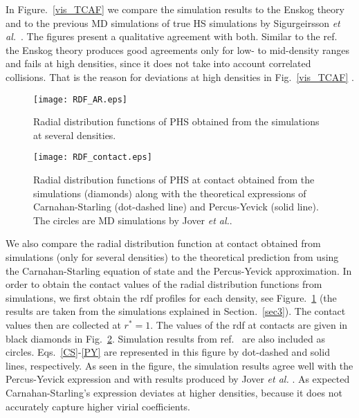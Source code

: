 \documentclass[preprint,pre,aps,superscriptaddress,a4paper]{revtex4}
\begin{document}
In Figure.~\ref{vis_TCAF} we compare the simulation results to the Enskog theory  and to the  previous MD simulations of  true HS simulations by Sigurgeirsson  {\it {et al.}}~\cite{heyes:09:0}.  The figures present a qualitative agreement with both. Similar to the ref.~\cite{heyes:09:0}  the Enskog theory produces good agreements only for low- to mid-density ranges and fails at high densities, since it does not take into account correlated collisions.
That is the reason for deviations at high densities in Fig.~\ref{vis_TCAF}  \cite{Santos:16:0,Viswanath:07:0,Sengers:00:0,Lucas:79:0}. 
\begin{figure}[H]
\centering
\vspace{1cm}
\texttt{[image: RDF\_AR.eps]}
\vspace{-0.5cm}
\caption{Radial distribution functions of PHS obtained from the simulations at several densities.  }
\label{rdf_ar}
\end{figure}
\begin{figure}[H]
\centering
\vspace{1cm}
\texttt{[image: RDF\_contact.eps]}
\vspace{-0.5cm}
\caption{Radial distribution functions of PHS at contact obtained from the simulations (diamonds) along  with  the theoretical expressions of Carnahan-Starling  (dot-dashed line) and Percus-Yevick (solid line). The circles are MD simulations by  Jover {\it {et al.}}.}
\label{rdf_contact}
\end{figure}

We also compare the radial distribution function at contact obtained from simulations (only for several densities) to the theoretical prediction from using the Carnahan-Starling equation of state and the Percus-Yevick approximation.
In order to obtain the contact values of the radial distribution functions from simulations, we first obtain the rdf profiles for each  density, see Figure.~\ref{rdf_ar} (the results are taken from the  simulations explained in Section.~\ref{sec3}). The contact values then are collected at $r^*=1$. The values of the  rdf at contacts are given in black diamonds in Fig.~\ref{rdf_contact}. Simulation results from ref.~\cite{jover:12:0} are also included as circles.
Eqs.~\ref{CS}-\ref{PY} are represented in this figure by dot-dashed and solid  lines, respectively. As seen in the figure, the simulation results agree well with the Percus-Yevick expression and with results produced  by  Jover {\it {et al.}} \cite{jover:12:0}.
As expected Carnahan-Starling's expression deviates at higher densities, because it does not accurately capture higher virial coefficients.
\end{document}
